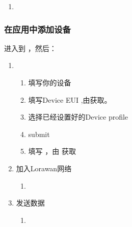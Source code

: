 \documentclass[a4paper,12pt,english]{sphinxmanual}
\begin{document}
{{\begin{enumerate}
\begin{itemize}
\item {} 
\sphinxAtStartPar
Description

\end{itemize}

\item {} 
\sphinxAtStartPar
{}

\end{enumerate}


\subsubsection{在应用中添加设备}
\label{\detokenize{exp-lora/lorawan-esp32:id9}}
\sphinxAtStartPar
进入到 ，然后：
\begin{enumerate}
%
\item {} 
\sphinxAtStartPar
{}
\begin{enumerate}
%
\item {} 
\sphinxAtStartPar
填写你的设备

\item {} 
\sphinxAtStartPar
填写Device EUI ,由获取。

\item {} 
\sphinxAtStartPar
选择已经设置好的Device profile

\item {} 
\sphinxAtStartPar
submit

\item {} 
\sphinxAtStartPar
填写 ，由  获取

\end{enumerate}

\item {} 
\sphinxAtStartPar
加入Lorawan网络
\begin{enumerate}
%
\item {} 
\sphinxAtStartPar
{}

\end{enumerate}

\item {} 
\sphinxAtStartPar
发送数据
\begin{enumerate}
%
\item {} 
\sphinxAtStartPar
{}


\end{enumerate}
\end{enumerate}}}
\end{document}
